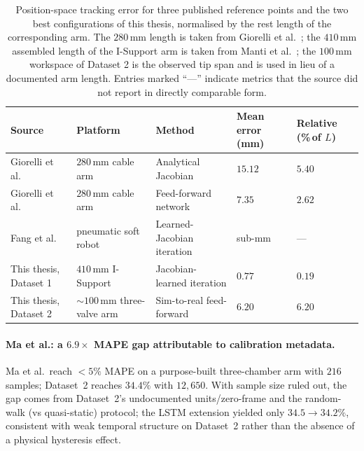 \begin{table}[ht]
\centering
\caption[Position-space tracking error against published baselines.]{Position-space tracking error for three published reference points and the two best configurations of this thesis, normalised by the rest length of the corresponding arm. The $280$\,mm length is taken from Giorelli et al.\ \cite{giorelli2015nn}; the $410$\,mm assembled length of the I-Support arm is taken from Manti et al.\ \cite{manti2016soft}; the $100$\,mm workspace of Dataset 2 is the observed tip span and is used in lieu of a documented arm length. Entries marked ``---'' indicate metrics that the source did not report in directly comparable form.}
\label{tab:disc_benchmarks}
\begin{tabularx}{\linewidth}{@{}l X X X X@{}}
\toprule
Source                                              & Platform                      & Method                      & Mean error (mm)   & Relative (\%\,of $L$) \\
\midrule
Giorelli et al.\ \cite{giorelli2015nn}               & $280$\,mm cable arm            & Analytical Jacobian          & $15.12$             & $5.40$                  \\
Giorelli et al.\ \cite{giorelli2015nn}               & $280$\,mm cable arm            & Feed-forward network         & $7.35$              & $2.62$                  \\
Fang et al.\ \cite{fang2022jacobian}                 & pneumatic soft robot           & Learned-Jacobian iteration   & sub-mm              & ---                     \\
This thesis, Dataset 1                               & $410$\,mm I-Support            & Jacobian-learned iteration   & $0.77$              & $0.19$                  \\
This thesis, Dataset 2                               & $\sim\!100$\,mm three-valve arm & Sim-to-real feed-forward     & $6.20$              & $6.20$                  \\
\bottomrule
\end{tabularx}
\end{table}

\paragraph{Ma et al.: a $6.9\times$ MAPE gap attributable to calibration metadata.}
Ma et al.\ reach $<5\%$ MAPE on a purpose-built three-chamber arm with $216$ samples; Dataset~2 reaches $34.4\%$ with $12{,}650$. With sample size ruled out, the gap comes from Dataset~2's undocumented units/zero-frame and the random-walk (vs quasi-static) protocol; the LSTM extension yielded only $34.5 \to 34.2\%$, consistent with weak temporal structure on Dataset~2 rather than the absence of a physical hysteresis effect.

